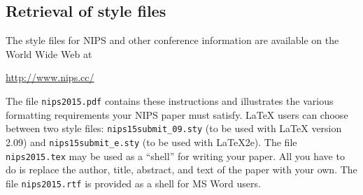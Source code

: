 \documentclass{article} %
\begin{document}







\subsection{Retrieval of style files}

The style files for NIPS and other conference information are available on the World Wide Web at
\begin{center}
   \url{http://www.nips.cc/}
\end{center}
The file \verb+nips2015.pdf+ contains these 
instructions and illustrates the
various formatting requirements your NIPS paper must satisfy. \LaTeX{}
users can choose between two style files:
\verb+nips15submit_09.sty+ (to be used with \LaTeX{} version 2.09) and
\verb+nips15submit_e.sty+ (to be used with \LaTeX{}2e). The file
\verb+nips2015.tex+ may be used as a ``shell'' for writing your paper. All you
have to do is replace the author, title, abstract, and text of the paper with
your own. The file
\verb+nips2015.rtf+ is provided as a shell for MS Word users.
\end{document}

